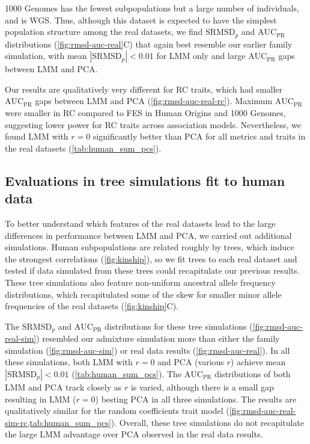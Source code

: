 \documentclass[11pt]{article}
\newcommand{\rmsd}{\text{SRMSD}_p}
\newcommand{\auc}{\text{AUC}_\text{PR}}
\begin{document}
1000 Genomes has the fewest subpopulations but a large number of individuals, and is WGS.
Thus, although this dataset is expected to have the simplest population structure among the real datasets, we find $\rmsd$ and $\auc$ distributions (\cref{fig:rmsd-auc-real}C) that again best resemble our earlier family simulation, with mean $|\rmsd| < 0.01$ for LMM only and large $\auc$ gaps between LMM and PCA.

Our results are qualitatively very different for RC traits, which had smaller $\auc$ gaps between LMM and PCA (\cref{fig:rmsd-auc-real-rc}).
Maximum $\auc$ were smaller in RC compared to FES in Human Origins and 1000 Genomes, suggesting lower power for RC traits across association models.
Nevertheless, we found LMM with $r=0$ significantly better than PCA for all metrics and traits in the real datasets (\cref{tab:human_sum_pcs}).

\subsection{Evaluations in tree simulations fit to human data}

To better understand which features of the real datasets lead to the large differences in performance between LMM and PCA, we carried out additional simulations.
Human subpopulations are related roughly by trees, which induce the strongest correlations (\cref{fig:kinship}), so we fit trees to each real dataset and tested if data simulated from these trees could recapitulate our previous results.
These tree simulations also feature non-uniform ancestral allele frequency distributions, which recapitulated some of the skew for smaller minor allele frequencies of the real datasets (\cref{fig:kinship}C).

The $\rmsd$ and $\auc$ distributions for these tree simulations (\cref{fig:rmsd-auc-real-sim}) resembled our admixture simulation more than either the family simulation (\cref{fig:rmsd-auc-sim}) or real data results (\cref{fig:rmsd-auc-real}).
In all these simulations, both LMM with $r=0$ and PCA (various $r$) achieve mean $|\rmsd| < 0.01$ (\cref{tab:human_sum_pcs}).
The $\auc$ distributions of both LMM and PCA track closely as $r$ is varied, although there is a small gap resulting in LMM ($r=0$) besting PCA in all three simulations.
The results are qualitatively similar for the random coefficients trait model (\cref{fig:rmsd-auc-real-sim-rc,tab:human_sum_pcs}).
Overall, these tree simulations do not recapitulate the large LMM advantage over PCA observed in the real data results.
\end{document}
